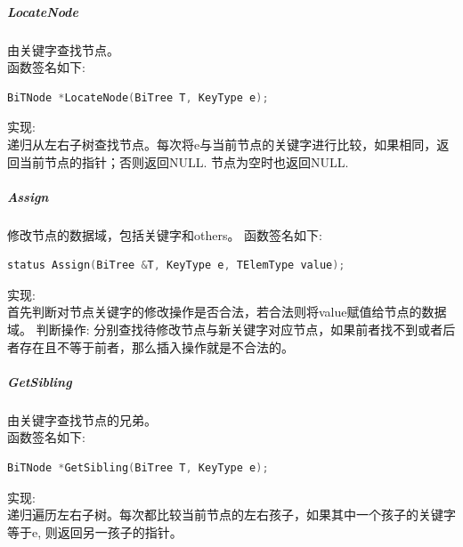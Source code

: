 \documentclass[supercite]{Experimental_Report}
\theoremstyle{definition}
\begin{document}
\subparagraph{LocateNode}
\noindent
由关键字查找节点。 \\
函数签名如下:
\begin{lstlisting}[language=C++, frame=single]
BiTNode *LocateNode(BiTree T, KeyType e);
\end{lstlisting}
实现: \\
递归从左右子树查找节点。每次将e与当前节点的关键字进行比较，如果相同，返回当前节点的指针；否则返回NULL. 节点为空时也返回NULL. \\

\subparagraph{Assign}
\noindent
修改节点的数据域，包括关键字和others。
函数签名如下:
\begin{lstlisting}[language=C++, frame=single]
status Assign(BiTree &T, KeyType e, TElemType value);
\end{lstlisting}
实现: \\
首先判断对节点关键字的修改操作是否合法，若合法则将value赋值给节点的数据域。
判断操作: 分别查找待修改节点与新关键字对应节点，如果前者找不到或者后者存在且不等于前者，那么插入操作就是不合法的。

\subparagraph{GetSibling}
\noindent
由关键字查找节点的兄弟。 \\
函数签名如下:
\begin{lstlisting}[language=C++, frame=single]
BiTNode *GetSibling(BiTree T, KeyType e);
\end{lstlisting}
实现: \\
递归遍历左右子树。每次都比较当前节点的左右孩子，如果其中一个孩子的关键字等于e, 则返回另一孩子的指针。\\
\end{document}
